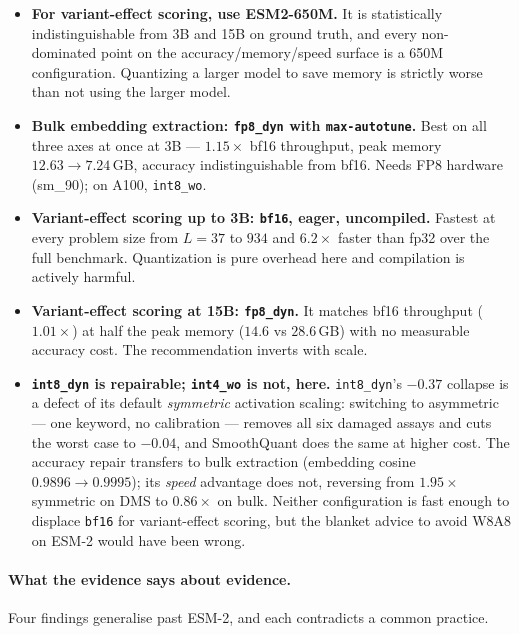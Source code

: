 \documentclass[11pt]{article}
\newcommand{\cfg}[1]{\texttt{#1}}
\begin{document}
\begin{itemize}\setlength{\itemsep}{2pt}
  \item \textbf{For variant-effect scoring, use ESM2-650M.} It is
        statistically indistinguishable from 3B and 15B on ground truth, and
        every non-dominated point on the accuracy/memory/speed surface is a
        650M configuration. Quantizing a larger model to save memory is
        strictly worse than not using the larger model.
  \item \textbf{Bulk embedding extraction: \cfg{fp8\_dyn} with
        \texttt{max-autotune}.} Best on all three axes at once at 3B ---
        $1.15\times$ bf16 throughput, peak memory $12.63 \to 7.24$\,GB, accuracy
        indistinguishable from bf16. Needs FP8 hardware (sm\_90); on A100,
        \cfg{int8\_wo}.
  \item \textbf{Variant-effect scoring up to 3B: \cfg{bf16}, eager,
        uncompiled.} Fastest at every problem size from $L=37$ to $934$ and
        $6.2\times$ faster than fp32 over the full benchmark. Quantization is
        pure overhead here and compilation is actively harmful.
  \item \textbf{Variant-effect scoring at 15B: \cfg{fp8\_dyn}.} It matches bf16
        throughput ($1.01\times$) at half the peak memory ($14.6$ vs $28.6$\,GB) with
        no measurable accuracy cost. The recommendation inverts with scale.
  \item \textbf{\cfg{int8\_dyn} is repairable; \cfg{int4\_wo} is not, here.}
        \cfg{int8\_dyn}'s $-0.37$ collapse is a defect of its default
        \emph{symmetric} activation scaling: switching to asymmetric --- one
        keyword, no calibration --- removes all six damaged assays and cuts the
        worst case to $-0.04$, and SmoothQuant does the same at higher cost.
        The accuracy repair transfers to bulk extraction (embedding cosine
        $0.9896 \to 0.9995$); its \emph{speed} advantage does not, reversing
        from $1.95\times$ symmetric on DMS to $0.86\times$ on bulk.
        Neither configuration is fast enough to displace \cfg{bf16} for
        variant-effect scoring, but the blanket advice to avoid W8A8 on ESM-2
        would have been wrong.
\end{itemize}

\paragraph{What the evidence says about evidence.} Four findings generalise past
ESM-2, and each contradicts a common practice.
\end{document}
